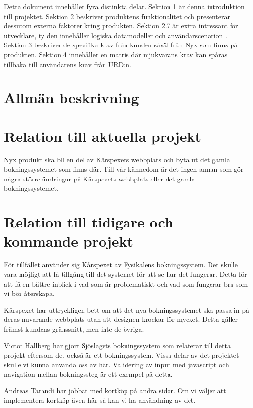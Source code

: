 \documentclass[a4paper, twoside, 11pt, titlepage]{article}
\begin{document}
Detta dokument innehåller fyra distinkta delar. Sektion 1 är denna introduktion till projektet. Sektion 2 beskriver produktens funktionalitet och presenterar dessutom externa faktorer kring produkten. Sektion 2.7 är extra intressant för utvecklare, ty den innehåller logiska datamodeller och användarscenarion .  Sektion 3 beskriver de specifika krav från kunden såväl från Nyx som finns på produkten. Sektion 4 innehåller en matris där mjukvarans krav kan spåras tillbaka till användarens krav från URD:n.

\clearpage
\section{Allmän beskrivning}



\clearpage
\section{Relation till aktuella projekt}


Nyx produkt ska bli en del av Kårspexets webbplats och byta ut det gamla bokningssystemet som finns där. Till vår kännedom är det ingen annan som gör några större ändringar på Kårspexets webbplats eller det gamla bokningssystemet.

\clearpage
\section{Relation till tidigare och kommande projekt}


För tillfället använder sig Kårspexet av Fysikalens bokningssystem. Det skulle vara möjligt att få tillgång till det systemet för att se hur det fungerar. Detta för att få en bättre inblick i vad som är problematiskt och vad som fungerar bra som vi bör återskapa.

Kårspexet har uttryckligen bett om att det nya bokningssystemet ska passa in på deras nuvarande webbplats utan att designen krockar för mycket. Detta gäller främst kundens gränssnitt, men inte de övriga.

Victor Hallberg har gjort Sjöslagets bokningssystem som relaterar till detta projekt eftersom det också är ett bokningssystem. Vissa delar av det projektet skulle vi kunna använda oss av här. Validering av input med javascript och navigation mellan bokningssteg är ett exempel på detta.

Andreas Tarandi har jobbat med kortköp på andra sidor. Om vi väljer att implementera kortköp även här så kan vi ha användning av det.
\end{document}
